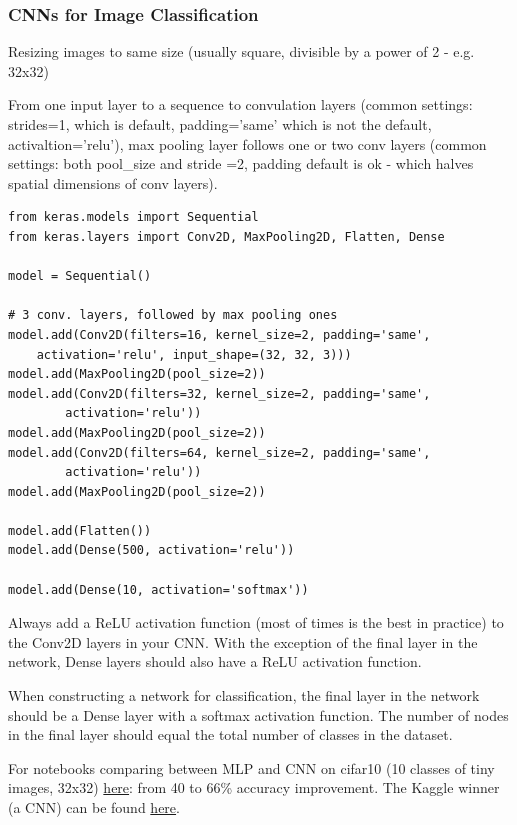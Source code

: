 \documentclass[11pt]{article}
\begin{document}
\subsubsection*{CNNs for Image Classification}
Resizing images to same size (usually square, divisible by a power of 2 - e.g. 32x32)

From one input layer to a sequence to convulation layers (common settings: strides=1, which is default, padding='same' which is not the default, activaltion='relu'), max pooling layer follows one or two conv layers (common settings: both pool\_size and stride =2, padding default is ok - which halves spatial dimensions of conv layers).

\begin{lstlisting}
from keras.models import Sequential
from keras.layers import Conv2D, MaxPooling2D, Flatten, Dense

model = Sequential()

# 3 conv. layers, followed by max pooling ones
model.add(Conv2D(filters=16, kernel_size=2, padding='same', 
	activation='relu', input_shape=(32, 32, 3)))
model.add(MaxPooling2D(pool_size=2))
model.add(Conv2D(filters=32, kernel_size=2, padding='same', 
		activation='relu'))
model.add(MaxPooling2D(pool_size=2))
model.add(Conv2D(filters=64, kernel_size=2, padding='same', 
		activation='relu'))
model.add(MaxPooling2D(pool_size=2))

model.add(Flatten())
model.add(Dense(500, activation='relu'))

model.add(Dense(10, activation='softmax'))
\end{lstlisting}

Always add a ReLU activation function (most of times is the best in practice) to the Conv2D layers in your CNN. With the exception of the final layer in the network, Dense layers should also have a ReLU activation function. 

When constructing a network for classification, the final layer in the network should be a Dense layer with a softmax activation function. The number of nodes in the final layer should equal the total number of classes in the dataset.

For notebooks comparing between MLP and CNN on cifar10 (10 classes of tiny images, 32x32) \href{https://github.com/udacity/aind2-cnn/tree/master/cifar10-classification}{here}: from 40 to 66\% accuracy improvement. The Kaggle winner (a CNN) can be found \href{http://blog.kaggle.com/2015/01/02/cifar-10-competition-winners-interviews-with-dr-ben-graham-phil-culliton-zygmunt-zajac/}{here}.
\end{document}
